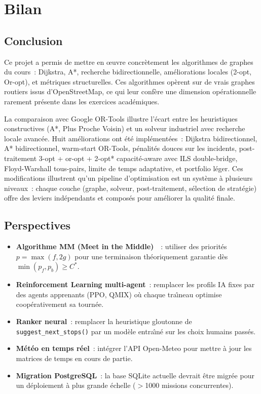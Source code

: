 \documentclass[a4paper, 12pt, twoside]{article}
\begin{document}
\section{Bilan}

\subsection{Conclusion}

Ce projet a permis de mettre en \oe uvre concr\`{e}tement les algorithmes de graphes du cours~: Dijkstra, A*, recherche bidirectionnelle, am\'{e}liorations locales (2-opt, Or-opt), et m\'{e}triques structurelles. Ces algorithmes op\`{e}rent sur de vrais graphes routiers issus d'OpenStreetMap, ce qui leur conf\`{e}re une dimension op\'{e}rationnelle rarement pr\'{e}sente dans les exercices acad\'{e}miques.

La comparaison avec Google OR-Tools illustre l'\'{e}cart entre les heuristiques constructives (A*, Plus Proche Voisin) et un solveur industriel avec recherche locale avanc\'{e}e. Huit am\'{e}liorations ont \'{e}t\'{e} impl\'{e}ment\'{e}es~: Dijkstra bidirectionnel, A* bidirectionnel, warm-start OR-Tools, p\'{e}nalit\'{e}s douces sur les incidents, post-traitement 3-opt + or-opt + 2-opt* capacit\'{e}-aware avec ILS double-bridge, Floyd-Warshall tous-pairs, limite de temps adaptative, et portfolio l\'{e}ger. Ces modifications illustrent qu'un pipeline d'optimisation est un syst\`{e}me \`{a} plusieurs niveaux~: chaque couche (graphe, solveur, post-traitement, s\'{e}lection de strat\'{e}gie) offre des leviers ind\'{e}pendants et compos\'{e}s pour am\'{e}liorer la qualit\'{e} finale.

\subsection{Perspectives}

\begin{itemize}
  \item \textbf{Algorithme MM (Meet in the Middle)}~\cite{mm}~: utiliser des priorit\'{e}s $p = \max(f, 2g)$ pour une terminaison th\'{e}oriquement garantie d\`{e}s $\min(p_f, p_b) \geq C^*$.
  \item \textbf{Reinforcement Learning multi-agent}~: remplacer les profils IA fixes par des agents apprenants (PPO, QMIX) o\`{u} chaque tra\^{\i}neau optimise coop\'{e}rativement sa tourn\'{e}e.
  \item \textbf{Ranker neural}~: remplacer la heuristique gloutonne de \texttt{suggest\_next\_stops()} par un mod\`{e}le entra\^{\i}n\'{e} sur les choix humains pass\'{e}s.
  \item \textbf{M\'{e}t\'{e}o en temps r\'{e}el}~: int\'{e}grer l'API Open-Meteo pour mettre \`{a} jour les matrices de temps en cours de partie.
  \item \textbf{Migration PostgreSQL}~: la base SQLite actuelle devrait \^{e}tre migr\'{e}e pour un d\'{e}ploiement \`{a} plus grande \'{e}chelle ($>$1000 missions concurrentes).
\end{itemize}
\end{document}
